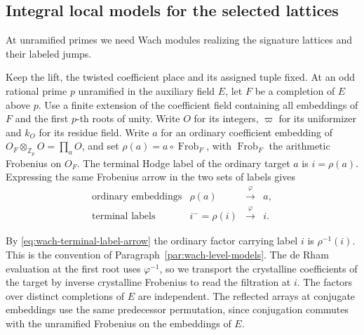 \subsection{Integral local models for the selected lattices}
\label{subsec:cut-wach-models}

At unramified primes we need Wach modules realizing the signature lattices and their labeled jumps.

Keep the lift, the twisted coefficient place and its assigned
tuple fixed. At an odd rational prime \(p\) unramified in the auxiliary field \(E\), let \(F\) be a completion of \(E\) above \(p\). Use a finite extension of
the coefficient field containing all embeddings of \(F\) and
the first \(p\)-th roots of unity. Write \(O\) for its integers,
\(\varpi\) for its uniformizer and \(k_O\) for its residue field.
Write \(a\) for an ordinary coefficient embedding of
\(O_F\otimes_{\mathbb Z_p}O=\prod_a O\), and set
\(\rho(a)=a\circ\operatorname{Frob}_F\), with
\(\operatorname{Frob}_F\) the arithmetic Frobenius on \(O_F\).
The terminal Hodge label of the ordinary target \(a\) is
\(i=\rho(a)\). Expressing the same Frobenius arrow in the two
sets of labels gives
\begin{equation}\label{eq:wach-terminal-label-arrow}
 \begin{array}{rclcl}
 \text{ordinary embeddings}&\rho(a)&\xrightarrow{\ \varphi\ }&a,\\
 \text{terminal labels}&i^-=\rho(i)&\xrightarrow{\ \varphi\ }&i .
 \end{array}
\end{equation}

By \eqref{eq:wach-terminal-label-arrow} the ordinary factor carrying label \(i\) is
\(\rho^{-1}(i)\). This is the convention of
Paragraph~\ref{par:wach-level-models}. The de Rham evaluation at
the first root uses \(\varphi^{-1}\), so we transport the
crystalline coefficients of the target by inverse crystalline
Frobenius to read the filtration at \(i\).
The factors over distinct completions of \(E\) are
independent. The reflected arrays at conjugate embeddings use
the same predecessor permutation, since conjugation commutes
with the unramified Frobenius on the embeddings of \(E\).

